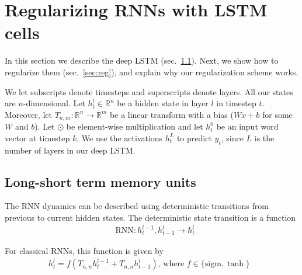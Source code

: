 \documentclass{article}
\begin{document}
\section{Regularizing RNNs with LSTM cells}

In this section we describe the deep LSTM (sec.~\ref{sec:lstm}). Next, 
we show how to regularize them (sec.~\ref{sec:reg}), and explain
why our regularization scheme works.

We let subscripts denote timesteps and superscripts denote 
layers.  All our states are $n$-dimensional.  Let $h^l_t
\in \mathbb{R}^{n}$ be a hidden state in layer $l$ in timestep
$t$. Moreover, let $T_{n,m}:\mathbb{R}^{n} \rightarrow \mathbb{R}^{m}$
be a linear transform with a bias ($Wx + b$ for some $W$ and $b$).
Let $\odot$ be element-wise multiplication and let $h^0_t$ be an
input word vector at timestep $k$.  We use the activations $h^{L}_t$ to predict $y_t$,
since $L$ is the number of layers in our deep LSTM.

\subsection{Long-short term memory units}
\label{sec:lstm}

The RNN dynamics can be described using deterministic transitions
from previous to current hidden states. 
The deterministic state transition is a function
\begin{align*}
  &\text{RNN} : h^{l-1}_t, h^l_{t-1} \rightarrow h^l_t
\end{align*}

For classical RNNs, this function is given by
\begin{align*}
  h^l_t = f(T_{n,n}h^{l-1}_t + T_{n,n}h^l_{t-1}) \text{, where $f \in \{\mathrm{sigm}, \tanh\}$ }
\end{align*}
\end{document}
